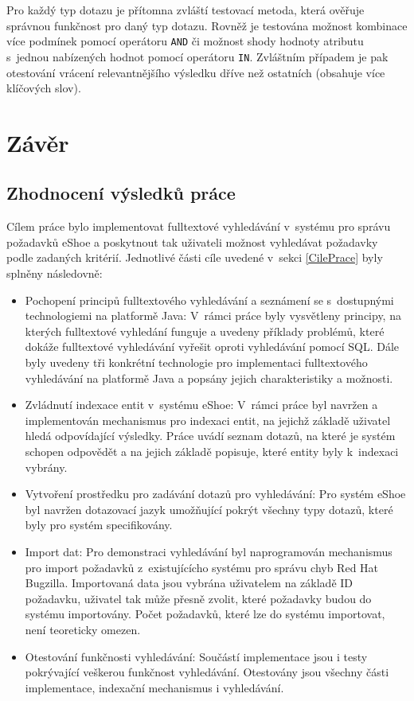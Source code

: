 \documentclass[11pt,oneside]{fithesis2}
\begin{document}
Pro každý typ dotazu je přítomna zvláští testovací metoda, která ověřuje správnou funkčnost pro daný typ dotazu. Rovněž je testována možnost kombinace více podmínek pomocí operátoru \texttt{AND} či možnost shody hodnoty atributu s~jednou nabízených hodnot pomocí operátoru \texttt{IN}. Zvláštním případem je pak otestování vrácení relevantnějšího výsledku dříve než ostatních (obsahuje více klíčových slov). 


\chapter{Závěr}
\label{ZaverChapter}

\section{Zhodnocení výsledků práce}
Cílem práce bylo implementovat fulltextové vyhledávání v~systému pro správu požadavků eShoe a poskytnout tak uživateli možnost vyhledávat požadavky podle zadaných kritérií. Jednotlivé části cíle uvedené v~sekci \ref{CilePrace} byly splněny následovně:
\begin{itemize}
	\item Pochopení principů fulltextového vyhledávání a seznámení se s~dostupnými technologiemi na platformě Java: V~rámci práce byly vysvětleny principy, na kterých fulltextové vyhledání funguje a uvedeny příklady problémů, které dokáže fulltextové vyhledávání vyřešit oproti vyhledávání pomocí SQL. Dále byly uvedeny tři konkrétní technologie pro implementaci fulltextového vyhledávání na platformě Java a popsány jejich charakteristiky a možnosti.

	\item Zvládnutí indexace entit v~systému eShoe: V~rámci práce byl navržen a implementován mechanismus pro indexaci entit, na jejichž základě uživatel hledá odpovídající výsledky. Práce uvádí seznam dotazů, na které je systém schopen odpovědět a na jejich základě popisuje, které entity byly k~indexaci vybrány.

	\item Vytvoření prostředku pro zadávání dotazů pro vyhledávání: Pro systém eShoe byl navržen dotazovací jazyk umožňující pokrýt všechny typy dotazů, které byly pro systém specifikovány.

	\item Import dat: Pro demonstraci vyhledávání byl naprogramován mechanismus pro import požadavků z~existujícícho systému pro správu chyb Red Hat Bugzilla. Importovaná data jsou vybrána uživatelem na základě ID požadavku, uživatel tak může přesně zvolit, které požadavky budou do systému importovány. Počet požadavků, které lze do systému importovat, není teoreticky omezen. 

	\item Otestování funkčnosti vyhledávání: Součástí implementace jsou i testy pokrývající veškerou funkčnost vyhledávání. Otestovány jsou všechny části implementace, indexační mechanismus i vyhledávání.
\end{itemize}
\end{document}

